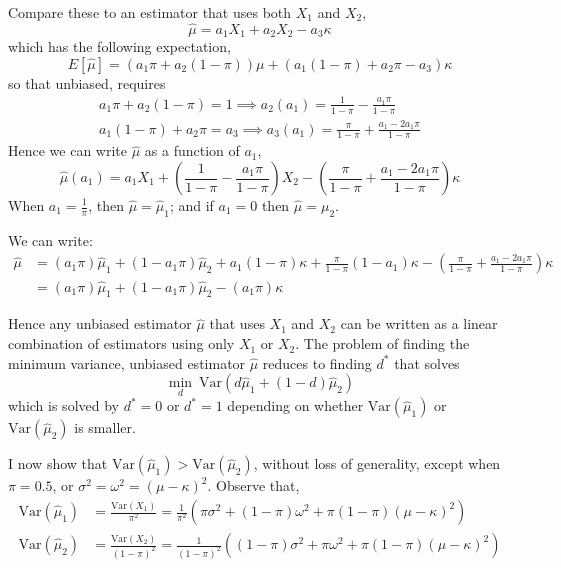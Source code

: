 \documentclass[11pt]{amsart}
\newcommand{\Var}[1]{\text{Var}\left(#1\right)}
\begin{document}
Compare these to an estimator that uses both $X_1$ and $X_2$, 
\begin{equation}
\hat{\mu} = a_1X_{1} + a_2 X_2 -  a_3 \kappa \label{mu} \end{equation}
which has the following expectation,
$$ E[\hat{\mu}] = (a_1 \pi + a_2 (1-\pi))\mu + (a_1(1-\pi)+a_2\pi - a_3)\kappa $$
so that unbiased, requires
\begin{gather}
    a_1\pi + a_2(1-\pi) = 1 \implies a_2(a_1) = \frac{1}{1-\pi} - \frac{a_1 \pi}{1-\pi} \\
    a_1 (1-\pi) + a_2 \pi = a_3 \implies a_3(a_1) = \frac{\pi}{1-\pi}  + \frac{a_1 - 2a_1 \pi}{1-\pi} 
\end{gather}
Hence we can write $\hat{\mu}$ as a function of $a_1$,  
 $$\hat{\mu}(a_1) = a_1 X_1 +  \left(\frac{1}{1-\pi} - \frac{a_1 \pi}{1-\pi}\right)  X_2 - \left(\frac{\pi}{1-\pi} + \frac{a_1 - 2a_1\pi}{1-\pi}\right)\kappa $$ 
When $a_1 = \frac{1}{\pi}$, then $\hat{\mu} = \hat{\mu}_1$; and if $a_1 = 0$ then $\hat{\mu}=\hat{\mu_2}$. 

We can write:
\begin{align*}
\hat{\mu} &= (a_1 \pi) \hat{\mu}_1 + (1-a_1\pi) \hat{\mu}_2 + a_1(1-\pi)\kappa  + \frac{\pi}{1-\pi}(1-a_1)\kappa - \left(\frac{\pi}{1-\pi} + \frac{a_1 - 2a_1\pi}{1-\pi}\right)\kappa  \\
&=  (a_1 \pi) \hat{\mu}_1 + (1-a_1\pi) \hat{\mu}_2 - (a_1\pi)\kappa
\end{align*}

Hence any unbiased estimator $\hat{\mu}$ that uses $X_1$ and $X_2$ can be written as a linear combination of estimators using only $X_1$ or $X_2$.  The problem of finding the minimum variance, unbiased estimator $\hat{\mu}$ reduces to finding $d^*$ that solves 
$$\min_d\  \Var{d \hat{\mu}_1 + (1-d) \hat{\mu}_2}$$
which is solved by $d^*= 0$ or $d^* = 1$ depending on whether $\Var{\hat{\mu}_1}$ or $\Var{\hat{\mu}_2}$ is smaller.  

I now show that $\Var{\hat{\mu}_1} > \Var{\hat{\mu}_2}$, without loss of generality, except when $\pi = 0.5$, or $\sigma^2 = \omega^2 = (\mu-\kappa)^2$.  Observe that,
\begin{align*} \Var{\hat{\mu}_1} &=  \frac{\text{Var}(X_1)}{\pi^2} = \frac{1}{\pi^2}\left(\pi \sigma^2 + (1-\pi) \omega^2 + \pi(1-\pi)(\mu-\kappa)^2\right) \\
\Var{\hat{\mu}_2} &= \frac{\Var{X_2}}{(1-\pi)^2} = \frac{1}{(1-\pi)^2}\left((1-\pi)\sigma^2 + \pi \omega^2 + \pi(1-\pi)(\mu-\kappa)^2\right) 
\end{align*}
\end{document}
